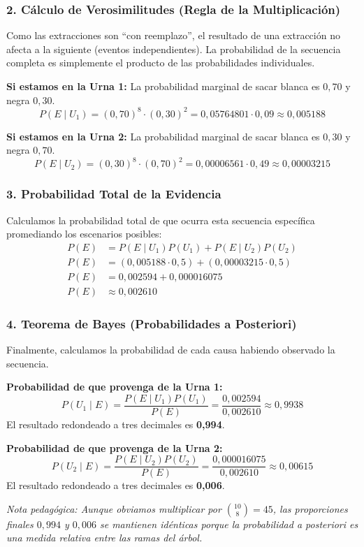 \documentclass[11pt,a4paper]{article}
\begin{document}
\subsubsection*{2. Cálculo de Verosimilitudes (Regla de la Multiplicación)}
Como las extracciones son ``con reemplazo'', el resultado de una extracción no afecta a la siguiente (eventos independientes). La probabilidad de la secuencia completa es simplemente el producto de las probabilidades individuales.

\vspace{0.3cm}
\noindent \textbf{Si estamos en la Urna 1:}
La probabilidad marginal de sacar blanca es $0,70$ y negra $0,30$.
$$P(E \mid U_1) = (0,70)^8 \cdot (0,30)^2 = 0,05764801 \cdot 0,09 \approx 0,005188$$

\vspace{0.3cm}
\noindent \textbf{Si estamos en la Urna 2:}
La probabilidad marginal de sacar blanca es $0,30$ y negra $0,70$.
$$P(E \mid U_2) = (0,30)^8 \cdot (0,70)^2 = 0,00006561 \cdot 0,49 \approx 0,00003215$$

\subsubsection*{3. Probabilidad Total de la Evidencia}
Calculamos la probabilidad total de que ocurra esta secuencia específica promediando los escenarios posibles:
\begin{align*}
P(E) &= P(E \mid U_1)P(U_1) + P(E \mid U_2)P(U_2) \\
P(E) &= (0,005188 \cdot 0,5) + (0,00003215 \cdot 0,5) \\
P(E) &= 0,002594 + 0,000016075 \\
P(E) &\approx 0,002610
\end{align*}

\subsubsection*{4. Teorema de Bayes (Probabilidades a Posteriori)}
Finalmente, calculamos la probabilidad de cada causa habiendo observado la secuencia.

\vspace{0.3cm}
\noindent \textbf{Probabilidad de que provenga de la Urna 1:}
$$P(U_1 \mid E) = \frac{P(E \mid U_1)P(U_1)}{P(E)} = \frac{0,002594}{0,002610} \approx 0,9938$$
El resultado redondeado a tres decimales es \textbf{0,994}.

\vspace{0.3cm}
\noindent \textbf{Probabilidad de que provenga de la Urna 2:}
$$P(U_2 \mid E) = \frac{P(E \mid U_2)P(U_2)}{P(E)} = \frac{0,000016075}{0,002610} \approx 0,00615$$
El resultado redondeado a tres decimales es \textbf{0,006}.

\vspace{0.3cm}
\noindent \textit{Nota pedagógica: Aunque obviamos multiplicar por $\binom{10}{8}=45$, las proporciones finales $0,994$ y $0,006$ se mantienen idénticas porque la probabilidad a posteriori es una medida relativa entre las ramas del árbol.}
\end{document}
